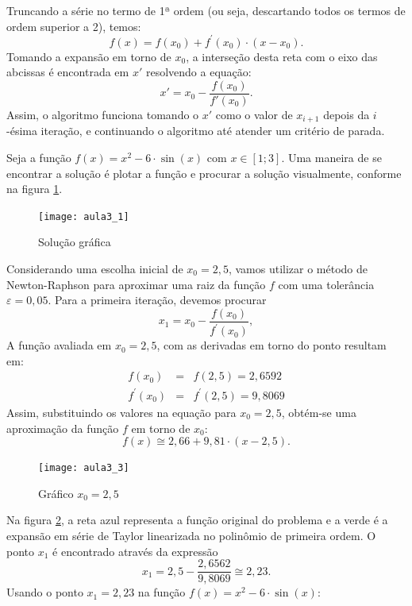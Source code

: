 Truncando a série no termo de 1ª ordem (ou seja, descartando todos os termos de ordem superior a 2), temos: 
\[
	f(x)=f(x_{0})+f^{'}(x_{0})\cdot(x-x_{0}).
\]
Tomando a expansão em torno de $x_0$, a interseção desta reta com o eixo das abcissas é encontrada em $x'$ resolvendo a equação: 
\[
	x' = x_0 - \dfrac{f(x_0)}{f'(x_0)} .
\]
Assim, o algoritmo funciona tomando o $x'$ como o valor de $x_{i+1}$ depois da $i$-ésima iteração, e continuando o algoritmo até atender um critério de parada. 


\begin{exemplo}
Seja a função $f(x)=x^{2}-6\cdot\sin(x)$ com $x\in[1;3]$. Uma maneira de se encontrar a solução é plotar a função e procurar a solução visualmente, conforme na figura \ref{fig:aula3_1}. 
\begin{figure}[H]
\begin{centering}
\texttt{[image: aula3\_1]}\protect\caption{\label{fig:aula3_1} Solução gráfica }
\end{centering}
\end{figure}

Considerando
uma escolha inicial de $x_{0}=2,5$, vamos utilizar o método de Newton-Raphson para aproximar uma raiz da função $f$ com uma tolerância $\varepsilon=0,05$.  Para a primeira iteração, devemos procurar
\[
x_{1}=x_{0}-\frac{f(x_{0})}{f^{'}(x_{0})},
\]
A função avaliada em $x_{0}=2,5$, com as derivadas em torno do ponto resultam
em:
\begin{eqnarray*}
f(x_{0}) & = & f(2,5)=2,6592 \\
f^{'}(x_{0}) & = & f^{'}(2,5)=9,8069
\end{eqnarray*}
Assim, substituindo os valores na equação para $x_{0}=2,5$, obtém-se uma aproximação da função $f$ em torno de $x_0$:
\[
f(x)\cong2,66+9,81\cdot(x-2,5).
\]

\begin{figure}[H]
\begin{centering}
\texttt{[image: aula3\_3]}\protect\caption{\label{fig:aula3_3} Gráfico  $x_{0}=2,5$  }
\end{centering}
\end{figure}
Na figura \ref{fig:aula3_3}, a reta azul representa a função original do problema e a verde é a expansão em série de Taylor linearizada no polinômio de primeira ordem. O ponto $x_1$ é encontrado através da expressão
\[
x_{1}=2,5-\frac{2,6562}{9,8069}\cong2,23.
\]
Usando o ponto $x_{1}=2,23$ na função $f(x)=x^{2}-6\cdot\sin(x)$:


\end{exemplo}
